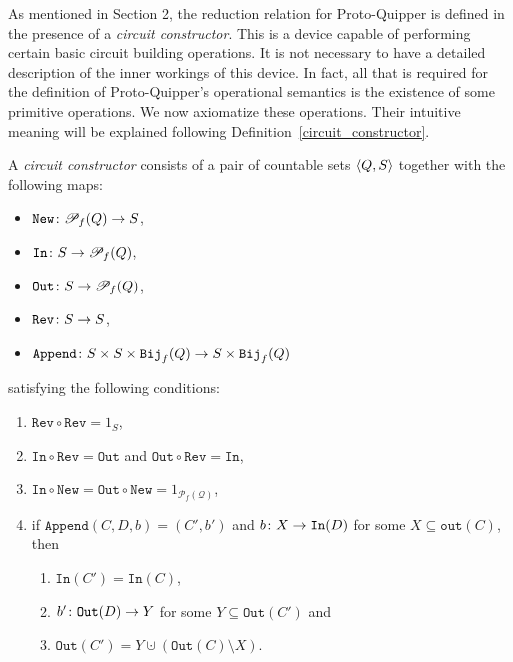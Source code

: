 \documentclass[twoside]{article}
\begin{document}
As mentioned in Section 2, the reduction relation for Proto-Quipper is
defined in the presence of a \emph{circuit constructor}. This is a
device capable of performing certain basic circuit building
operations. It is not necessary to have a detailed description of the
inner workings of this device. In fact, all that is required for the
definition of Proto-Quipper's operational semantics is the existence
of some primitive operations. We now axiomatize these
operations. Their intuitive meaning will be explained following
Definition~\ref{circuit_constructor}.

\begin{definition}
\label{circuit_constructor}
A \emph{circuit constructor} consists of a pair of countable sets $\langle Q,S\rangle$ 
together with the following maps:
\begin{itemize}
  \item $\mathtt{New}\colon {\mathscr{P}}_f(Q) \to S$,
  \item $\mathtt{In}\colon S\to {\mathscr{P}}_f(Q)$,
  \item $\mathtt{Out}\colon S\to {\mathscr{P}}_f(Q)$,
  \item $\mathtt{Rev}\colon S \to S$,
  \item $\mathtt{Append}\colon S\times S\times \texttt{Bij}_f(Q) \to S \times \texttt{Bij}_f(Q)$
\end{itemize}
satisfying the following conditions:
\begin{enumerate}
  \item $\mathtt{Rev}\circ\mathtt{Rev}=1_S$,
  \item $\mathtt{In}\circ\mathtt{Rev}= \mathtt{Out}$ and 
        $\mathtt{Out}\circ\mathtt{Rev}= \mathtt{In}$\label{in_out_rev},
  \item $\mathtt{In}\circ\mathtt{New} = \mathtt{Out}\circ\mathtt{New} =
    1_{\mathcal{P}_f(\mathcal{Q})}$,
  \item if $\mathtt{Append} (C,D,b)=(C',b')$ and 
    $b\colon X \to \mathtt{In}(D)$ for some $X\subseteq \mathtt{out}(C)$, 
    then \label{Append_cond_x}
    \begin{enumerate}
      \item $\mathtt{In}(C') = \mathtt{In}(C)$,\label{Append_cond_2b}    
      \item $b'\colon \mathtt{Out}(D)\to Y$ for some 
      $Y\subseteq \mathtt{Out}(C')$ and\label{Append_cond_2}
      \item $\mathtt{Out}(C')=Y\cupdot
      (\mathtt{Out}(C)\setminus X)$.\label{Append_cond_3}
    \end{enumerate}
\end{enumerate}
\end{definition}
\end{document}

